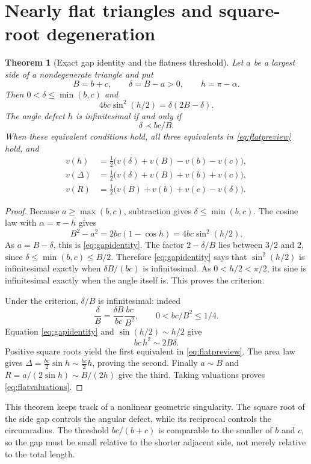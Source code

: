\documentclass[11pt,letterpaper]{article}
\newtheorem{theorem}{Theorem}[section]
\theoremstyle{definition}
\theoremstyle{remark}
\numberwithin{equation}{section}
\begin{document}
\section{Nearly flat triangles and square-root degeneration}\label{sec:flat}
\begin{theorem}[Exact gap identity and the flatness threshold]\label{thm:flat}
Let $a$ be a largest side of a nondegenerate triangle and put
\[
 B=b+c,\qquad \delta=B-a>0,\qquad h=\pi-\alpha.
\]
Then $0<\delta\le\min(b,c)$ and
\begin{equation}\label{eq:gapidentity}
 4bc\sin^2(h/2)=\delta(2B-\delta).
\end{equation}
The angle defect $h$ is infinitesimal if and only if
\begin{equation}\label{eq:flatcriterion}
 \delta\prec bc/B.
\end{equation}
When these equivalent conditions hold, all three equivalents in \eqref{eq:flatpreview} hold, and
\begin{align}\label{eq:flatvaluations}
 v(h)&=\tfrac12\bigl(v(\delta)+v(B)-v(b)-v(c)\bigr),\\
 v(\Delta)&=\tfrac12\bigl(v(\delta)+v(B)+v(b)+v(c)\bigr),\nonumber\\
 v(R)&=\tfrac12\bigl(v(B)+v(b)+v(c)-v(\delta)\bigr).\nonumber
\end{align}
\end{theorem}
\begin{proof}
Because $a\ge\max(b,c)$, subtraction gives $\delta\le\min(b,c)$. The cosine law with $\alpha=\pi-h$ gives
\[
 B^2-a^2=2bc(1-\cos h)=4bc\sin^2(h/2).
\]
As $a=B-\delta$, this is \eqref{eq:gapidentity}. The factor $2-\delta/B$ lies between $3/2$ and $2$, since $\delta\le\min(b,c)\le B/2$. Therefore \eqref{eq:gapidentity} says that $\sin^2(h/2)$ is infinitesimal exactly when $\delta B/(bc)$ is infinitesimal. As $0<h/2<\pi/2$, its sine is infinitesimal exactly when the angle itself is. This proves the criterion.

Under the criterion, $\delta/B$ is infinitesimal: indeed
\[
 \frac\delta B=\frac{\delta B}{bc}\frac{bc}{B^2},\qquad 0<bc/B^2\le1/4.
\]
Equation \eqref{eq:gapidentity} and $\sin(h/2)\sim h/2$ give
\[
 bc\,h^2\sim2B\delta.
\]
Positive square roots yield the first equivalent in \eqref{eq:flatpreview}. The area law gives $\Delta=\frac{bc}{2}\sin h\sim\frac{bc}{2}h$, proving the second. Finally $a\sim B$ and $R=a/(2\sin h)\sim B/(2h)$ give the third. Taking valuations proves \eqref{eq:flatvaluations}.
\end{proof}
This theorem keeps track of a nonlinear geometric singularity. The square root of the side gap controls the angular defect, while its reciprocal controls the circumradius. The threshold $bc/(b+c)$ is comparable to the smaller of $b$ and $c$, so the gap must be small relative to the shorter adjacent side, not merely relative to the total length.
\end{document}
